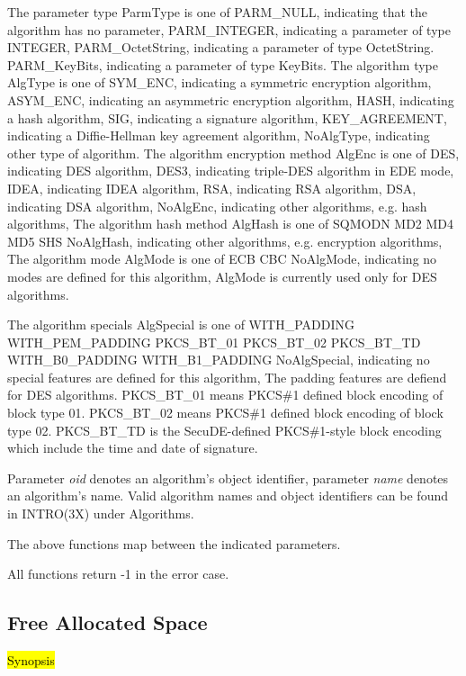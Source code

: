 The parameter type ParmType is one of 
\bi
\m PARM\_NULL, indicating that the algorithm has no parameter,
\m PARM\_INTEGER, indicating a parameter of type INTEGER,
\m PARM\_OctetString, indicating a parameter of type OctetString.
\m PARM\_KeyBits, indicating a parameter of type KeyBits.
\ei
The algorithm type AlgType is one of                                                   
\bi
\m SYM\_ENC, indicating a symmetric encryption algorithm,
\m ASYM\_ENC, indicating an asymmetric encryption algorithm,
\m HASH, indicating a hash algorithm,
\m SIG, indicating a signature algorithm,
\m KEY\_AGREEMENT, indicating a Diffie-Hellman key agreement algorithm,
\m NoAlgType, indicating other type of algorithm.
\ei
The algorithm encryption method AlgEnc is one of 
\bi
\m DES, indicating DES algorithm,
\m DES3, indicating triple-DES algorithm in EDE mode,
\m IDEA, indicating IDEA algorithm,
\m RSA, indicating RSA algorithm,
\m DSA, indicating DSA algorithm,
\m NoAlgEnc, indicating other algorithms, e.g. hash algorithms,
\ei
The algorithm hash method AlgHash is one of 
\bi
\m SQMODN
\m MD2
\m MD4
\m MD5
\m SHS
\m NoAlgHash, indicating other algorithms, e.g. encryption algorithms,
\ei
The algorithm mode AlgMode is one of 
\bi
\m ECB
\m CBC
\m NoAlgMode, indicating no modes are defined for this algorithm,
\ei
AlgMode is currently used only for DES algorithms.

The algorithm specials AlgSpecial is one of 
\bi
\m WITH\_PADDING
\m WITH\_PEM\_PADDING
\m PKCS\_BT\_01
\m PKCS\_BT\_02
\m PKCS\_BT\_TD
\m WITH\_B0\_PADDING
\m WITH\_B1\_PADDING
\m NoAlgSpecial, indicating no special features are defined for this algorithm,
\ei
The padding features are defiend for DES algorithms. PKCS\_BT\_01 means PKCS\#1
defined block encoding of block type 01. PKCS\_BT\_02 means PKCS\#1 defined block
encoding of block type 02. PKCS\_BT\_TD is the SecuDE-defined PKCS\#1-style
block encoding which include the time and date of signature.

Parameter {\em oid} denotes an algorithm's object identifier, parameter
{\em name} denotes an algorithm's name. Valid algorithm names and object 
identifiers can be found in INTRO(3X) under Algorithms.

The above functions map between the indicated parameters.

All functions return -1 in the error case.

\subsection{Free Allocated Space}
\label{aux_free}
\hl{Synopsis}


